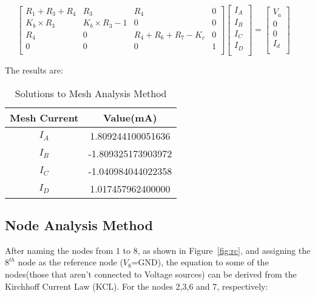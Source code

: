 $$
\begin{bmatrix} 
R_1+R_3+R_4       &   R_3       & R_4     &   0       \\
K_b \times R_3       &   K_b \times R_3-1       & 0    &   0      \\
R_4  &  0  &   R_4+R_6+R_7-K_c  &   0 \\   
0       &   0      & 0    &   1      \\
\end{bmatrix}
\begin{bmatrix} 
I_A     \\
I_B    \\
I_C   \\
I_D     \\
\end{bmatrix}
=
\begin{bmatrix} 
V_a   \\
0    \\
0  \\
I_d   \\
\end{bmatrix}
\quad
$$


The results are:

\begin{table}[h]


\label{tab:tables}
\begin{center}
\begin{tabular}{|c|c|} 
 \hline
  Mesh Current & Value\hspace{1mm}(mA)\\
 \hline
 $I_{A}$ & 1.809244100051636 \\
 \hline 
 $I_{B}$ &-1.809325173903972\\
 \hline
 $I_{C}$ &-1.040984044022358\\
 \hline
 $I_{D}$ &1.017457962400000\\
 \hline
\end{tabular}
\caption{Solutions to Mesh Analysis Method}
\label{table:tab2}
\end{center}
\end{table}

\subsection{Node Analysis Method}

After naming the nodes from 1 to 8, as shown in Figure~\ref{fig:rc}, and assigning the $8^{th}$ node as the reference node ($V_{8}$=GND), the equation to some of the nodes(those that aren't connected to Voltage sources) can be derived from the  Kirchhoff Current Law (KCL).
For the nodes 2,3,6 and 7, respectively:

